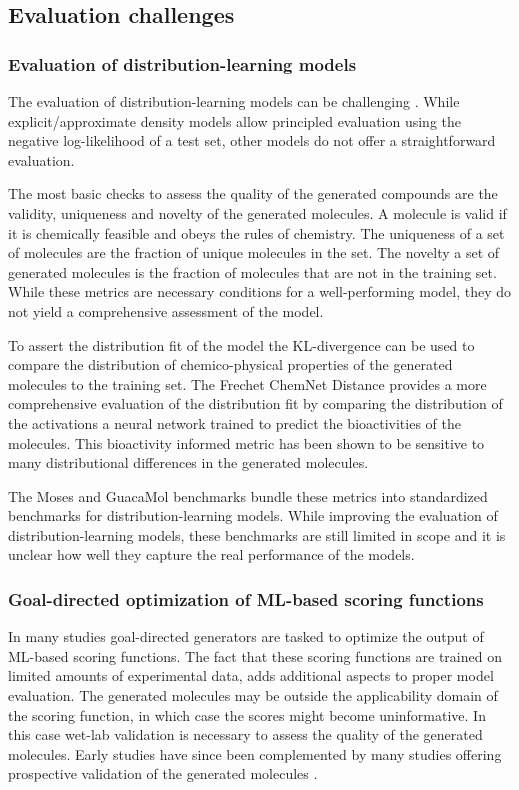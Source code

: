 \subsection{Evaluation challenges}
\subsubsection{Evaluation of distribution-learning models}
The evaluation of distribution-learning models can be challenging
\citep{vogtExploringChemicalSpace2023,bilodeauGenerativeModelsMolecular2022}. While
explicit/approximate density models allow principled evaluation using the negative log-likelihood of
a test set, other models do not offer a straightforward evaluation.

The most basic checks to assess the quality of the
generated compounds are the validity, uniqueness and novelty of the generated molecules. A molecule
is valid if it is chemically feasible and obeys the rules of chemistry. The uniqueness of a set of
molecules are the fraction of unique molecules in the set. The novelty a set of generated molecules
is the fraction of molecules that are not in the training set.  While these metrics are necessary
conditions for a well-performing model, they do not yield a comprehensive assessment of the model.

To assert the distribution fit of the model the KL-divergence can be used to compare the
distribution of chemico-physical properties of the generated molecules to the training set. The
Frechet ChemNet Distance \citep{preuerFrechetChemNetDistance2018} provides a more comprehensive
evaluation of the distribution fit by comparing the distribution of the activations a neural network
trained to predict the bioactivities of the molecules. This bioactivity informed metric has been shown
to be sensitive to many distributional differences in the generated molecules.

The Moses \citep{polykovskiyMolecularSetsMOSES2020} and GuacaMol
\citep{brownGuacaMolBenchmarkingModels2019} benchmarks bundle these metrics into standardized
benchmarks for distribution-learning models. While improving the evaluation of distribution-learning
models, these benchmarks are still limited in scope and it is unclear how well they capture the real
performance of the models.

\subsubsection{Goal-directed optimization of ML-based scoring functions}
In many studies goal-directed generators are tasked to optimize the output of ML-based scoring
functions. The fact that these scoring functions are trained on limited amounts of experimental data,
adds additional aspects to proper model evaluation. The generated molecules may be outside the
applicability domain of the scoring function, in which case the scores might become uninformative.
In this case wet-lab validation is necessary to assess the quality of the generated molecules.
Early studies \citep{merkNovoDesignBioactive2018,merkTuningArtificialIntelligence2018}
have since been complemented by many studies offering prospective validation of the generated
molecules \citep{duMachineLearningaidedGenerative2024}.


